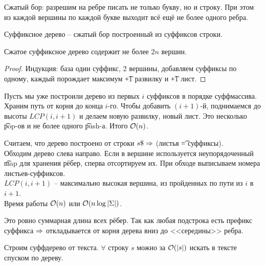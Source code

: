 \pagebreak
\vspace*{-1.5em}

\up
\begin{Def}
Сжатый бор: разрешим на ребре писать не только букву, но и строку. 
При этом из каждой вершины по каждой букве выходит всё ещё не более одного ребра.
\end{Def}
\up\up
\begin{Def}
Суффиксное дерево -- сжатый бор построенный из суффиксов строки.
\end{Def}

\begin{Lm}
Сжатое суффиксное дерево содержит не более $2n$ вершин.
\end{Lm}
\begin{proof}
Индукция: база один суффикс, 2 вершины, добавляем суффиксы по одному, каждый порождает максимум \t{+}1 развилку и \t{+}1 лист.
\end{proof}

\up
{}

Пусть мы уже построили дерево из первых $i$ суффиксов в порядке суффмассива.
Храним путь от корня до конца $i$-го. Чтобы добавить $(i+1)$-й, поднимаемся до высоты $LCP(i,i{+}1)$ и делаем новую развилку, новый лист.
Это несколько \t{pop}-ов и не более одного \t{push}-а. Итого $\mathcal{O}(n)$.


Считаем, что дерево построено от строки $s\$ \Rightarrow$ (листья \t{=} суффиксы).\\
Обходим дерево слева направо. Если в вершине используется неупорядоченный \t{map} для хранения рёбер, сперва отсортируем их.
При обходе выписываем номера листьев-суффиксов. \\
$LCP(i,i+1)$ -- максимально высокая вершина, из пройденных по пути из $i$ в $i+1$.\\
Время работы $\mathcal{O}(n)$ или $\mathcal{O}(n \log |\Sigma|)$.



Это ровно суммарная длина всех рёбер. Так как любая подстрока есть префикс суффикса $\Rightarrow$ откладывается от корня дерева вниз до <<середины>> ребра.


Строим суффдерево от текста. $\forall$ строку $s$ можно за $\mathcal{O}(|s|)$ искать в тексте спуском по дереву.

